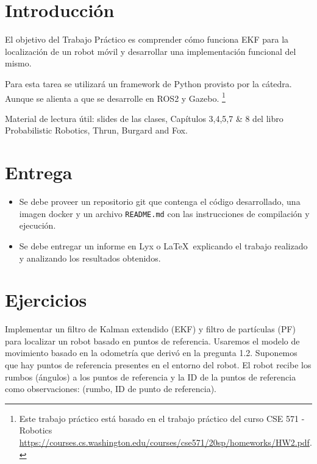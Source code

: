 \documentclass[tp]{lcc}
\begin{document}
	\maketitle
	
	
	\section{Introducción}
	
	El objetivo del Trabajo Práctico es comprender cómo funciona EKF para la localización de un robot móvil y desarrollar una implementación funcional del mismo.
	
	Para esta tarea se utilizará un framework de Python provisto por la cátedra. Aunque se alienta a que se desarrolle en ROS2 y Gazebo. \footnote{Este trabajo práctico está basado en el trabajo práctico del curso CSE 571 - Robotics \url{https://courses.cs.washington.edu/courses/cse571/20sp/homeworks/HW2.pdf}.}
	
	Material de lectura útil: slides de las clases, Capítulos 3,4,5,7 \& 8 del libro Probabilistic Robotics, Thrun, Burgard and Fox.
	
	
	\section{Entrega}
	\begin{itemize}
		\item Se debe proveer un repositorio git que contenga el código desarrollado, una imagen docker y un archivo \lstinline{README.md} con las instrucciones de compilación y ejecución.
		
		\item Se debe entregar un informe en Lyx o \LaTeX\  explicando el trabajo realizado y analizando los resultados obtenidos.
	\end{itemize}

	
	\section{Ejercicios}
	
	
	Implementar un filtro de Kalman extendido (EKF) y filtro de partículas (PF) para localizar un robot basado en puntos de referencia. Usaremos el modelo de movimiento basado en la odometría que derivó en la pregunta 1.2. Suponemos que hay puntos de referencia presentes en el entorno del robot. El robot recibe los rumbos (ángulos) a los puntos de referencia y la ID de la puntos de referencia como observaciones: (rumbo, ID de punto de referencia).
	
\end{document}
